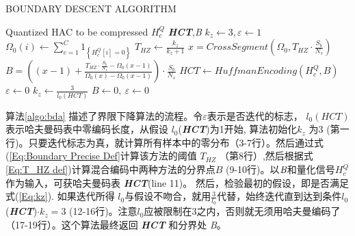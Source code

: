 \renewcommand{\algorithmicrequire}{ \textbf{Input:}}      %
\renewcommand{\algorithmicensure}{ \textbf{Output:}}     %
\begin{algorithm}
\caption{BOUNDARY DESCENT ALGORITHM}
\label{algo:bda}
\begin{algorithmic}[1]  
\Require Quantized HAC to be compressed $H_c^Q$
\Ensure  \textbf{\emph{HCT}},\emph{B}
\State	$k_z\leftarrow3,\varepsilon\leftarrow1$
            \State $\Omega_0(i)\leftarrow \sum_{c=1}^C 1_{\left\{H_c^Q[i]=0\right\}}$
        \EndFor
    \EndFor
    \State $T_{HZ}\leftarrow \frac{k_z}{k_z+1}$
    \State $x=CrossSegment\left(\Omega_0,T_{HZ}\cdot\frac{S_b}{N_s}\right)$
    \State $B=\left((x-1)+\frac{T_{HZ}\cdot \frac{S_b}{N_s}-\Omega_0(x-1)}{\Omega_0(x)-\Omega_0(x-1)}\right)\cdot \frac{S_b}{N_s}$
    \State $HCT\leftarrow Huffman Encoding(H_c^Q,B)$
        \State $\varepsilon\leftarrow 0$
    \Else
    	    \State $k_z\leftarrow \frac{3}{l_0(HCT)}$
    	\Else
	        \State $B\leftarrow 0,\ \varepsilon\leftarrow0$
	    \EndIf
    \EndIf
\EndWhile
\end{algorithmic} 
\end{algorithm}


算法\ref{algo:bda} 描述了界限下降算法的流程。令$\varepsilon$表示是否迭代的标志， $l_0(HCT)$ 表示哈夫曼码表中零编码长度，从假设 $l_0$(\textbf{\emph{HCT}})为1开始, 算法初始化$k_z$ 为3 (第一行)。只要迭代标志为真，就计算所有样本中的零分布（3-7行）。然后通过式(\ref{Eq:Boundary Precise Def}计算该方法的阈值 $T_{HZ}$ （第8行）,然后根据式\ref{Eq:T_HZ def})计算混合编码中两种方法的分界点$B$ (9-10行)。以$\emph{B}$和量化信号$H_c^Q$作为输入，可获哈夫曼码表 \textbf{\emph{HCT}}(line 11)。
然后，检验最初的假设，即是否满足式(\ref{Eq:kz}). 如果迭代所得 $l_0$与假设不吻合，就用$\frac{3}{l_0}$代替，始终迭代直到达到条件$l_0$(\textbf{\emph{HCT}})$\cdot k_z = 3$ (12-16行)。注意$l_0$应被限制在3之内，否则就无须用哈夫曼编码了（17-19行）。这个算法最终返回 \textbf{\emph{HCT}} 和分界处 \emph{B}。

